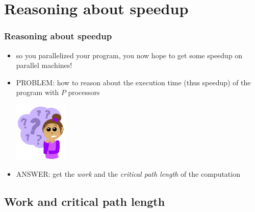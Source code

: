 \documentclass[12pt,dvipdfmx]{beamer}
\newcommand{\ao}[1]{{\color{blue}#1}}
\newcommand{\aka}[1]{{\color{red}#1}}
\begin{document}
\section{Reasoning about speedup}

\begin{frame}
\frametitle{Reasoning about speedup}

\begin{itemize}

\item<1-> so you parallelized your program, you now
  hope to get some speedup on parallel machines!

\item<2-> \aka{PROBLEM:} how to reason about
  the execution time (thus speedup) of the program with $P$
  processors

\begin{center}
\includegraphics[width=0.2\textwidth]{out/pdf/svg/Question_Girl.pdf}  
\end{center}

\item<3-> \ao{ANSWER:} get the 
  \ao{\em work} and the \ao{\em critical path length} 
  of the computation
\end{itemize}
\end{frame}

\subsection{Work and critical path length}

\end{document}
